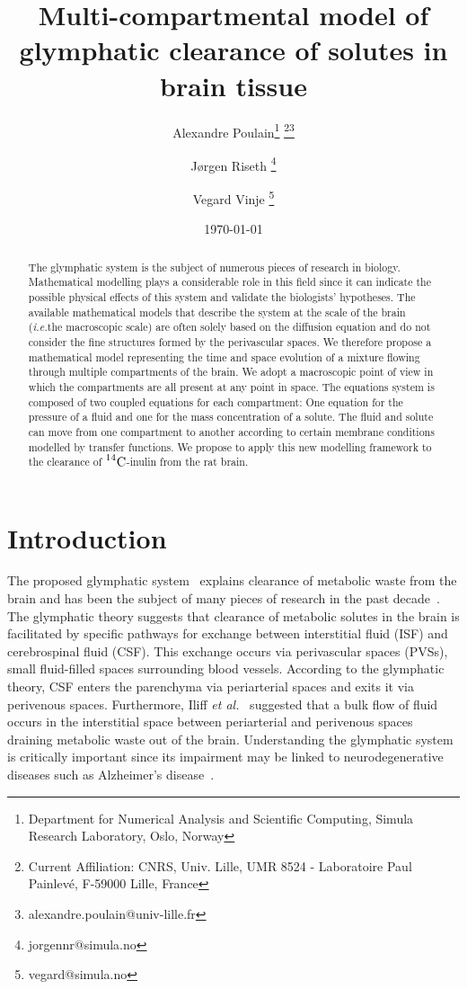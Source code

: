 \documentclass[a4paper,11pt]{article}
\title{Multi-compartmental model of glymphatic clearance of solutes in brain tissue}
\author{Alexandre Poulain\thanks{Department for Numerical Analysis and Scientific Computing, Simula Research Laboratory, Oslo, Norway} 
\thanks{Current Affiliation: CNRS, Univ. Lille, UMR 8524 - Laboratoire Paul Painlev\'e, F-59000 Lille, France}\thanks{alexandre.poulain@univ-lille.fr} \and Jørgen Riseth \thanks{jorgennr@simula.no} \and Vegard Vinje \thanks{vegard@simula.no}}
\date{\today}
\newcommand{\ie}{\emph{i.e.}\;}
\newcommand{\etal}{\emph{et al.}\;}
\newcommand{\1}{^{(1)}}
\newcommand{\2}{^{(2)}}
\newcommand{\Cinulin}{$\prescript{14}{}{\text{C}}$-inulin }
\begin{document}
\maketitle


\begin{abstract}
    The glymphatic system is the subject of numerous pieces of research in biology. Mathematical modelling plays a considerable role in this field since it can indicate the possible physical effects of this system and validate the biologists' hypotheses. The available mathematical models that describe the system at the scale of the brain (\ie the macroscopic scale) are often solely based on the diffusion equation and do not consider the fine structures formed by the perivascular spaces.   
    We therefore propose a mathematical model representing the time and space evolution of a mixture flowing through multiple compartments of the brain. We adopt a macroscopic point of view in which the compartments are all present at any point in space. The equations system is composed of two coupled equations for each compartment: One equation for the pressure of a fluid and one for the mass concentration of a solute. The fluid and solute can move from one compartment to another according to certain membrane conditions modelled by transfer functions. We propose to apply this new modelling framework to the clearance of \Cinulin from the rat brain. 
\end{abstract}


\section{Introduction}
The proposed glymphatic system~\cite{Iliff_2012_PVS} explains clearance of metabolic waste from the brain and has been the subject of many pieces of research in the past decade~\cite{Iliff_2012_PVS, Holter9894,abbott_role_2018,jessen_glymphatic_2015}. The glymphatic theory suggests that clearance of metabolic solutes in the brain is facilitated by specific pathways for exchange between interstitial fluid (ISF) and cerebrospinal fluid (CSF). This exchange occurs via perivascular spaces (PVSs), small fluid-filled spaces surrounding blood vessels. According to the glymphatic theory, CSF enters the parenchyma via periarterial spaces and exits it via perivenous spaces. Furthermore, Iliff \etal~\cite{Iliff_2012_PVS} suggested that a bulk flow of fluid occurs in the interstitial space between periarterial and perivenous spaces draining metabolic waste out of the brain. Understanding the glymphatic system is critically important since its impairment may be linked to neurodegenerative diseases such as Alzheimer's disease~\cite {reeves_glymphatic_2020}.
\end{document}
